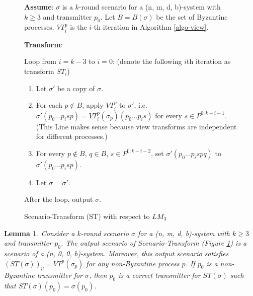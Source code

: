 \documentclass[11pt,conference,compsoc,onecolumn,romanappendices]{IEEEtran}
\newcommand{\nin}{\not\in}
\newcommand{\tmstrong}[1]{\textbf{#1}}
\newenvironment{tmindent}{\begin{tmparmod}{1.0em}{1.0em}{0pt} }{\end{tmparmod}}
\newenvironment{tmparmod}[3]{\begin{list}{}{\setlength{\topsep}{0pt}\setlength{\leftmargin}{#1}\setlength{\rightmargin}{#2}\setlength{\parindent}{#3}\setlength{\listparindent}{\parindent}\setlength{\itemindent}{\parindent}\setlength{\parsep}{\parskip}} \item[]}{\end{list}}
\newtheorem{lemma}{Lemma}
\begin{document}
\begin{figure}[h]
  {\tmstrong{Assume}}: {\tmstrong{}} $\sigma$ is a $k$-round scenario for a (n,
  m, d, b)-system with $k \geqslant 3$ and transmitter $p_0$. Let $B =
  B (\sigma)$ be the set of Byzantine processes. $V T_i^p$ is the $i$-th iteration  in Algorithm \ref{algo-view}. {\hspace*{\fill}}
  
  {\tmstrong{Transform}}:{\hspace*{\fill}}
  
  Loop from $i = k - 3$ to $i = 0$: (denote the following $i$th iteration as transform $S
  T_i$)
  \begin{tmindent}
    \begin{enumerate}
      \item Let $\sigma'$ be a copy of $\sigma$.
      
      \item For each $p \nin B$, apply $V T_i^p$ to $\sigma'$, i.e. $\sigma'
      (p_0 \ldots p_i s p) = V T_i^p (\sigma_p) (p_0 \ldots p_i s)$ for every
      $s \in P^{0 : k - i - 1}$. (This Line makes sense because view transforms
      are independent for different processes.)
      
      \item For every $p \nin B$, $q \in B$, $s \in P^{0 : k - i - 2}$, set
      $\sigma' (p_0 \ldots p_i s p q)$ to $\sigma' (p_0 \ldots p_i s p)$.
      
      \item Let $\sigma = \sigma'$.
    \end{enumerate}
  \end{tmindent}
  After the loop, output $\sigma$.
\caption{Scenario-Transform (ST) with respect to $L M_3$}
\label{fig-scenario}
\end{figure}

\begin{lemma}\label{lemma-scenario}
  Consider a $k$-round scenario $\sigma$ for a (n, m, d, b)-system
  with $k \geqslant 3$ and transmitter $p_0$. The output scenario
  of Scenario-Transform (Figure \ref{fig-scenario}) is a scenario of a (n, 0, 0, b)-system.
  Moreover, this output scenario satisfies $(S T(\sigma))_p = V T^p (\sigma_p)$ for any non-Byzantine process $p$. If
  $p_0$ is a non-Byzantine transmitter for $\sigma$, then $p_0$ is a correct
  transmitter for $S T (\sigma)$ such that $S T (\sigma) (p_0) = \sigma
  (p_0)$.
\end{lemma}
\end{document}
